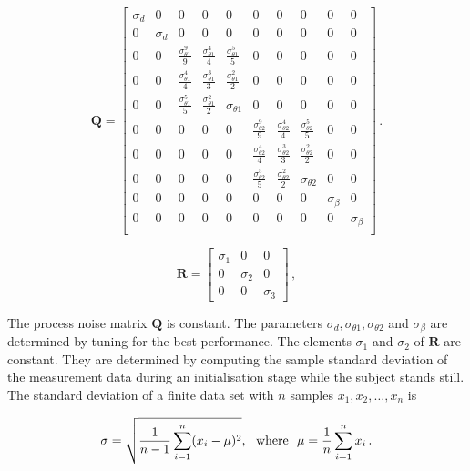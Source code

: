 \begin{equation}
\mathbf{Q} = \begin{bmatrix}
  \sigma_d & 0 & 0 & 0 & 0 & 0 & 0 & 0 & 0 & 0\\
  0 & \sigma_d & 0 & 0 & 0 & 0 & 0 & 0 & 0 & 0\\
  0 & 0 & \frac{\sigma^9_{\theta 1}}{9} & \frac{\sigma^4_{\theta 1}}{4} & \frac{\sigma^5_{\theta 1}}{5} & 0 & 0 & 0 & 0 & 0\\
  0 & 0 & \frac{\sigma^4_{\theta 1}}{4} & \frac{\sigma^3_{\theta 1}}{3} & \frac{\sigma^2_{\theta 1}}{2} & 0 & 0 & 0 & 0 & 0\\
  0 & 0 & \frac{\sigma^5_{\theta 1}}{5} & \frac{\sigma^2_{\theta 1}}{2} & \sigma_{\theta 1} & 0 & 0 & 0 & 0 & 0\\
  0 & 0 & 0 & 0 & 0 & \frac{\sigma^9_{\theta 2}}{9} & \frac{\sigma^4_{\theta 2}}{4} & \frac{\sigma^5_{\theta 2}}{5} & 0 & 0\\
  0 & 0 & 0 & 0 & 0 & \frac{\sigma^4_{\theta 2}}{4} & \frac{\sigma^3_{\theta 2}}{3} & \frac{\sigma^2_{\theta 2}}{2} & 0 & 0\\
  0 & 0 & 0 & 0 & 0 & \frac{\sigma^5_{\theta 2}}{5} & \frac{\sigma^2_{\theta 2}}{2} & \sigma_{\theta 2} & 0 & 0\\
  0 & 0 & 0 & 0 & 0 & 0 & 0 & 0 & \sigma_{\beta} & 0\\
  0 & 0 & 0 & 0 & 0 & 0 & 0 & 0 & 0 & \sigma_{\beta}\\
\end{bmatrix}\,.
\end{equation}

\begin{equation}
\mathbf{R} = \begin{bmatrix}
  \sigma_1 & 0 & 0\\
  0 & \sigma_2 & 0\\
  0 & 0 & \sigma_3
\end{bmatrix}\,,
\end{equation}

\noindent
The process noise matrix $\mathbf{Q}$ is constant. The parameters $\sigma_d, \sigma_{\theta 1}, \sigma_{\theta 2}$ and $\sigma_{\beta}$ are determined by tuning for the best performance. The elements $\sigma_1$ and $\sigma_2$ of $\mathbf{R}$ are constant. They are determined by computing the sample standard deviation of the measurement data during an initialisation stage while the subject stands still. The standard deviation of a finite data set with $n$ samples $x_1, x_2, \dots, x_n$ is

\begin{equation}
  \sigma = \sqrt{\frac{1}{n-1} \sum_{i=1}^n (x_i - \mu)^2}, {\rm \ \ where\ \ } \mu = \frac{1}{n} \sum_{i=1}^n x_i\,.
\end{equation}

